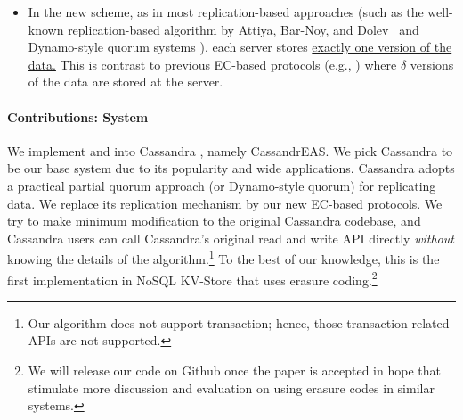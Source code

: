 {\begin{itemize}
	
	
	
	\item In the new scheme, as in most replication-based approaches (such as the well-known replication-based algorithm by Attiya, Bar-Noy, and Dolev~\cite{ABD96} and Dynamo-style quorum systems \cite{Cassandra2010,Dynamo07,pbs-vldb2012}),  each server stores \underline{exactly one version of the data.} This is contrast to previous EC-based protocols (e.g., \cite{CadambeLMM14}) where $\delta$ versions of the data are stored at the server. 
\end{itemize}


\paragraph*{Contributions: System}

We implement \treasmod{} and \oreas{} into Cassandra \cite{Cassandra2010}, namely CassandrEAS.
We pick Cassandra to be our base system due to its popularity and wide applications.
Cassandra adopts a practical partial quorum approach (or Dynamo-style quorum) \cite{pbs-vldb2012} for replicating data.
We replace its replication mechanism by our new EC-based protocols.
We try to make minimum modification to the original Cassandra codebase, and Cassandra users can call Cassandra's original read and write API directly \textit{without} knowing the details of the algorithm.\footnote{Our algorithm does not support transaction; hence, those transaction-related APIs are not supported.} 
To the best of our knowledge, this is the first implementation in NoSQL KV-Store that uses erasure coding.\footnote{We will release our code on Github once the paper is accepted in hope that stimulate more discussion and evaluation on using erasure codes in similar systems.} 

}
